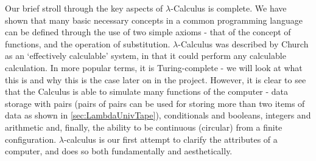 \documentclass[Master.tex]{subfiles}
\begin{document}
Our brief stroll through the key aspects of $\lambda$-Calculus is complete. We have shown that many basic necessary concepts in a common programming language can be defined through the use of two simple axioms - that of the concept of functions, and the operation of substitution. $\lambda$-Calculus was described by Church as an `effectively calculable' system, in that it could perform any calculable calculation. In more popular terms, it is Turing-complete - we will look at what this is and why this is the case later on in the project. However, it is clear to see that the Calculus is able to simulate many functions of the computer - data storage with pairs (pairs of pairs can be used for storing more than two items of data as shown in \cref{sec:LambdaUnivTape}), conditionals and booleans, integers and arithmetic and, finally, the ability to be continuous (circular) from a finite configuration. $\lambda$-calculus is our first attempt to clarify the attributes of a computer, and does so both fundamentally and aesthetically.
\end{document}
